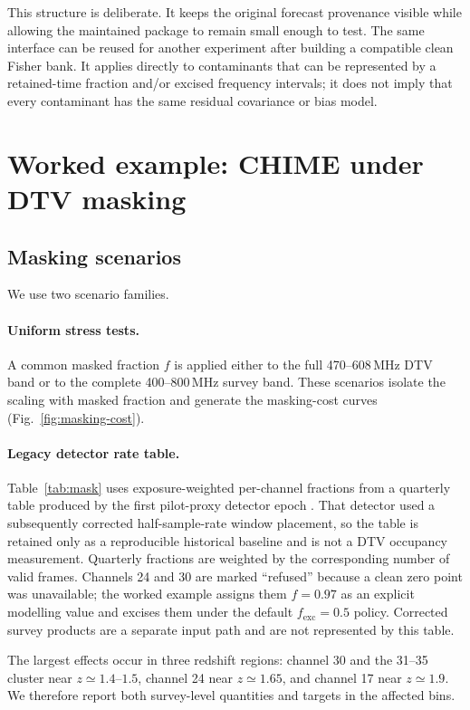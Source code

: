 This structure is deliberate. It keeps the original forecast provenance
visible while allowing the maintained package to remain small enough to
test. The same interface can be reused for another experiment after
building a compatible clean Fisher bank. It applies directly to
contaminants that can be represented by a retained-time fraction and/or
excised frequency intervals; it does not imply that every contaminant
has the same residual covariance or bias model.

\section{Worked example: CHIME under DTV masking}
\label{sec:example}

\subsection{Masking scenarios}
\label{sec:scenarios}

We use two scenario families.

\paragraph{Uniform stress tests.}
A common masked fraction $f$ is applied either to the full
470--608\,MHz DTV band or to the complete 400--800\,MHz survey band.
These scenarios isolate the scaling with masked fraction and generate
the masking-cost curves (Fig.~\ref{fig:masking-cost}).

\paragraph{Legacy detector rate table.}
Table~\ref{tab:mask} uses exposure-weighted per-channel fractions from a
quarterly table produced by the first pilot-proxy detector epoch
\citep{PilotProxy}. That detector used a subsequently corrected half-sample-rate
window placement, so the table is retained only as a reproducible historical
baseline and is not a DTV occupancy measurement. Quarterly fractions are
weighted by the corresponding number of valid frames. Channels 24 and 30 are
marked ``refused'' because a clean zero point was unavailable; the worked
example assigns them $f=0.97$ as an explicit modelling value and excises them
under the default $f_\mathrm{exc}=0.5$ policy. Corrected survey products are a
separate input path and are not represented by this table.

The largest effects occur in three redshift regions: channel 30 and the
31--35 cluster near $z\simeq1.4$--$1.5$, channel 24 near
$z\simeq1.65$, and channel 17 near $z\simeq1.9$. We therefore report
both survey-level quantities and targets in the affected bins.

